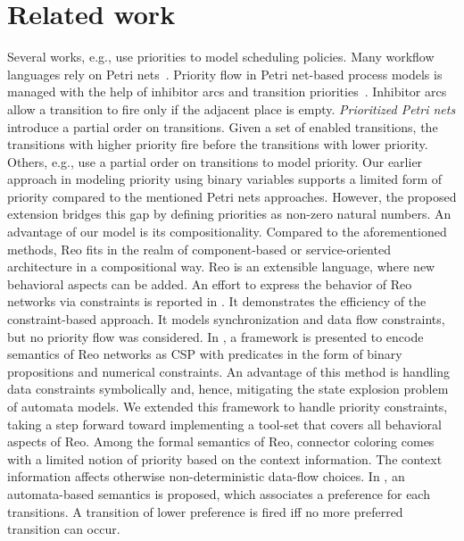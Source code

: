 \section{Related work}
\label{sec:relatedWork}
Several works, e.g., \cite{Furicht:2002:CAF:564092.564117,petriprio,Bause1997} use priorities to model 
scheduling policies. Many workflow languages rely on Petri nets~\cite{Aalst02workflowpatterns,vanderAalst:2005:YYW:1187495.1187496}.
Priority flow in Petri net-based process models is managed with the help of inhibitor arcs and transition priorities~\cite{Padberg2015}. Inhibitor arcs allow a transition to fire only if the adjacent place is empty. \emph{Prioritized Petri nets} 
\cite{Balbo2001} introduce a partial order on transitions. Given a set of enabled transitions, the transitions with higher priority fire before the transitions with lower priority. Others, e.g.,  \cite{DBLP:journals/fuin/LomazovaP16,VALERO2012290} use a partial order on transitions to model priority. Our earlier approach in modeling priority using binary variables supports a limited form of priority compared to the mentioned Petri nets approaches. However, the proposed extension bridges this gap by defining priorities as non-zero natural numbers. An advantage of our model is its compositionality. Compared to the aforementioned methods, Reo fits in the realm of component-based or service-oriented architecture in a compositional way. Reo is an extensible language, where new behavioral aspects can be added. An effort to express the behavior of Reo networks via constraints is reported in \cite{ClarkeProenca10}. It demonstrates the efficiency of the constraint-based approach. It models synchronization and data flow constraints, but no priority flow was considered. In \cite{behconstraint}, a framework is presented to encode semantics of Reo networks as CSP with predicates in the form of binary propositions and numerical constraints. An advantage of this method is handling data constraints symbolically and, hence, mitigating the state explosion problem of automata models. We extended this framework to handle priority constraints, taking a step forward toward implementing a tool-set that covers all behavioral aspects of Reo. Among the formal semantics of Reo, connector coloring comes with a limited notion of priority based on the context information. The context information affects otherwise non-deterministic data-flow choices. In \cite{KappeAT16}, an automata-based semantics is proposed, which associates a preference for each transitions. A transition of lower preference is fired iff no more preferred transition can occur.

